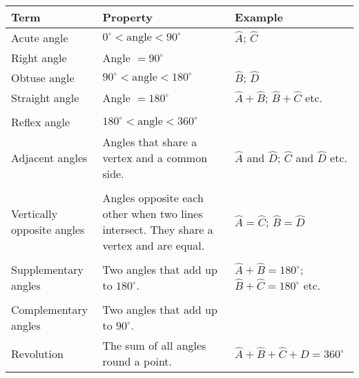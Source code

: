 \begin{table}[H]
\begin{center}
\begin{tabular}{|l|p{4cm}|l|} \hline
\textbf{Term} & \textbf{Property} & \textbf{Example}\\ \hline
Acute angle & $0^{\circ} < \mbox{angle} < 90^{\circ}$ & $\hat{A}$; $\hat{C}$ \\ \hline
Right angle & Angle $= 90^{\circ}$ &  \\ \hline
Obtuse angle & $90^{\circ} < \mbox{angle} < 180^{\circ}$ & $\hat{B}$; $\hat{D}$ \\ \hline
Straight angle & Angle $= 180^{\circ}$ & $\hat{A} + \hat{B}$;  $\hat{B} + \hat{C}$ etc.   \\
& &  \\ \hline
Reflex angle & $180^{\circ} < \mbox{angle} < 360^{\circ}$ &  \\ \hline
Adjacent angles & Angles that share a vertex and a common side. & $\hat{A}$ and $\hat{D}$;  $\hat{C}$ and $\hat{D}$ etc. \\ 
& &  \\ \hline
Vertically opposite angles & Angles opposite each other when two lines intersect. They share a vertex and are equal. & $\hat{A}=\hat{C}$;  $\hat{B}=\hat{D}$\\
 &  & \\ \hline
Supplementary angles & Two angles that add up to $180^{\circ}$. & $\hat{A}+\hat{B}=180^{\circ}$; $\hat{B}+\hat{C}=180^{\circ}$ etc.\\ 
& &  \\ \hline
Complementary angles & Two angles that add up to $90^{\circ}$. & \\ \hline
Revolution & The sum of all angles round a point. &  $\hat{A}+\hat{B}+\hat{C}+\hat{D}=360^{\circ}$ \\ \hline

\end{tabular}
\end{center}
\end{table}
\par


